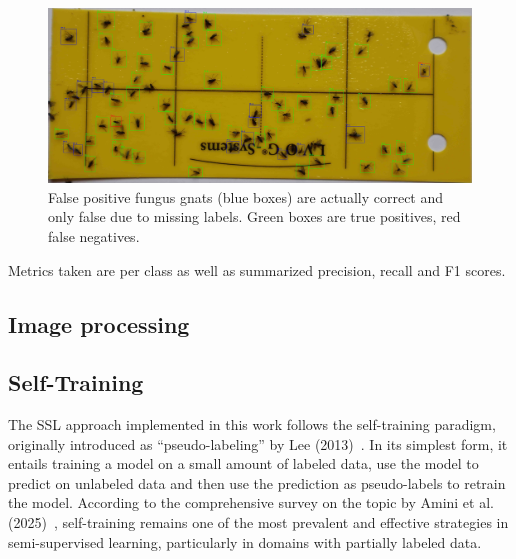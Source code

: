 \documentclass[12pt,a4paper]{article}
\begin{document}
\begin{figure}[H]  %
    \centering
    \includegraphics[width=1.0\textwidth]{images/false_positive_BRAIIM.jpg}  %
    \caption{False positive fungus gnats (blue boxes) are actually correct and only false due to missing labels. Green boxes are true positives, red false negatives.}
    \label{fig:false_positive_BRAIIMS}
\end{figure}

Metrics taken are per class as well as summarized precision, recall and F1 scores.






\subsection{Image processing}



\subsection{Self-Training}

The SSL approach implemented in this work follows the self-training paradigm, originally introduced as ``pseudo-labeling'' by Lee (2013)~\cite{lee_pseudo-label_nodate}. In its simplest form, it entails training a model on a small amount of labeled data, use the model to predict on unlabeled data and then use the prediction as pseudo-labels to retrain the model. According to the comprehensive survey on the topic by Amini et al. (2025)~\cite{amini_self-training_2025}, self-training remains one of the most prevalent and effective strategies in semi-supervised learning, particularly in domains with partially labeled data. 
\end{document}
